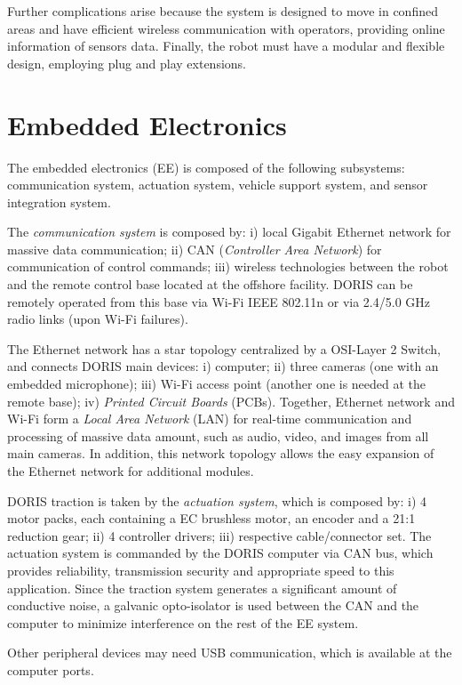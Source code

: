 \documentclass{ifacconf}
\begin{document}
Further complications arise because the system is designed to move in confined
areas and have efficient wireless communication with operators, providing
online information of sensors data. Finally, the robot must have a modular and
flexible design, employing plug and play extensions.


\section{Embedded Electronics}\label{sec:electronics_overview}
The embedded electronics (EE) is composed of the following subsystems:
communication system, actuation system, vehicle support system, and
sensor integration system.

The \emph{communication system} is composed by: i) local Gigabit Ethernet network for massive data communication; ii) CAN (\emph{Controller Area Network}) for communication of control commands; iii) wireless technologies between the robot and the remote control base located at the offshore facility. DORIS can be remotely operated from this base via Wi-Fi IEEE 802.11n or via 2.4/5.0 GHz radio links (upon Wi-Fi failures).

The Ethernet network has a star topology centralized by a OSI-Layer 2 Switch, and connects DORIS main devices: i) computer; ii) three cameras (one with an embedded microphone); iii) Wi-Fi access point (another one is needed at the remote base); iv) \emph{Printed Circuit Boards} (PCBs). Together, Ethernet network and Wi-Fi form a \emph{Local Area Network} (LAN) for real-time communication and processing of massive data amount, such as audio, video, and images from all main cameras. In addition, this network topology allows the easy expansion of the Ethernet network for additional modules.

DORIS traction is taken by the \emph{actuation system}, which is composed by: i) 4 motor packs, each containing a EC brushless motor, an encoder and a
21:1 reduction gear; ii) 4 controller drivers; iii) respective cable/connector set. The actuation system is commanded by the DORIS computer via CAN bus, which provides reliability, transmission security and appropriate speed to this application. Since the traction system generates a significant amount of conductive noise, a galvanic opto-isolator is used between the CAN and the computer to minimize interference on the rest of the EE system.

Other peripheral devices may need USB communication, which is available at the
computer ports.
\end{document}
